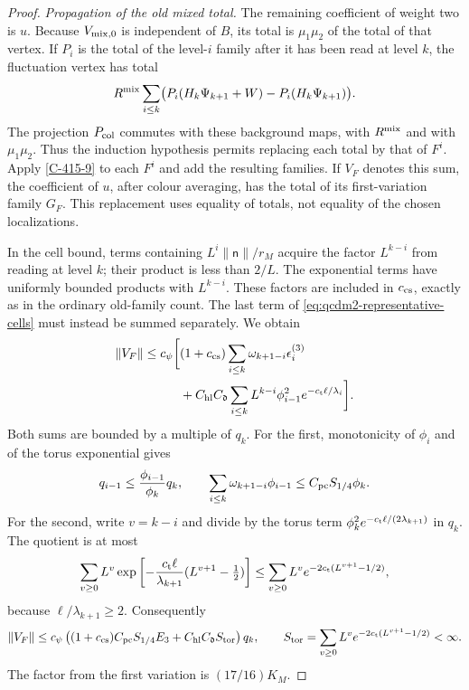 \documentclass[11pt,letterpaper,reqno]{amsart}
\theoremstyle{definition}
\theoremstyle{remark}
\begin{document}
\begin{proof}
\emph{Propagation of the old mixed total.}
The remaining coefficient of weight two is $u$.
Because $V_{{\rm mix},0}$ is independent of $B$, its
total is $\mu_1\mu_2$ of the total of that vertex.
If $P_i$ is the total of the level-$i$ family after
it has been read at level $k$, the fluctuation vertex
has total
\[
 R^{\rm mix}\sum_{i\le k}
       \bigl(P_i(H_k\Psi_{k+1}+W)-P_i(H_k\Psi_{k+1})\bigr).
\]
The projection $P_{\rm col}$ commutes with these
background maps, with $R^{\rm mix}$ and with $\mu_1\mu_2$.
Thus the induction hypothesis permits replacing each
total by that of $F^i$.  Apply \cref{C-415-9} to each
$F^i$ and add the resulting families.  If $V_F$ denotes
this sum, the coefficient of $u$, after colour averaging,
has the total of its first-variation family $G_F$.
This replacement uses equality of totals, not equality
of the chosen localizations.

In the cell bound, terms containing
$L^i\|\mathsf n\|/r_M$ acquire the factor $L^{k-i}$
from reading at level $k$; their product is less than
$2/L$.  The exponential terms have uniformly bounded
products with $L^{k-i}$.  These factors are included
in $c_{\rm cs}$, exactly as in the ordinary old-family
count.  The last term of
\eqref{eq:qcdm2-representative-cells} must instead be
summed separately.  We obtain
\begin{align*}
 \|V_F\|\le c_\psi\biggl[
 &(1+c_{\rm cs})\sum_{i\le k}\omega_{k+1-i}\epsilon_i^{(3)}\\
 &+C_{\rm hl}C_{\mathfrak d}\sum_{i\le k}
       L^{k-i}\phi_{i-1}^2e^{-c_{\rm t}\ell/\lambda_i}\biggr].
\end{align*}
Both sums are bounded by a multiple of $q_k$.
For the first, monotonicity of $\phi_i$ and of the
torus exponential gives
\[
 q_{i-1}\le\frac{\phi_{i-1}}{\phi_k}q_k,
 \qquad
 \sum_{i\le k}\omega_{k+1-i}\phi_{i-1}
                         \le C_{\rm pc}S_{1/4}\phi_k.
\]
For the second, write $v=k-i$ and divide by the
torus term $\phi_k^2e^{-c_{\rm t}\ell/(2\lambda_{k+1})}$
in $q_k$.  The quotient is at most
\[
 \sum_{v\ge0}L^v
   \exp\left[-\frac{c_{\rm t}\ell}{\lambda_{k+1}}
                          (L^{v+1}-\tfrac12)\right]
 \le\sum_{v\ge0}L^ve^{-2c_{\rm t}(L^{v+1}-1/2)},
\]
because $\ell/\lambda_{k+1}\ge2$.
Consequently
\begin{equation}\label{eq:qcdm2-old-cubic}
  \|V_F\|\le c_\psi\left((1+c_{\rm cs})C_{\rm pc}S_{1/4}E_3
         +C_{\rm hl}C_{\mathfrak d}S_{\rm tor}\right)q_k,
 \qquad
 S_{\rm tor}=\sum_{v\ge0}L^v
       e^{-2c_{\rm t}(L^{v+1}-1/2)}<\infty.
\end{equation}
The factor from the first variation is $(17/16)K_M$.


\end{proof}
\end{document}
